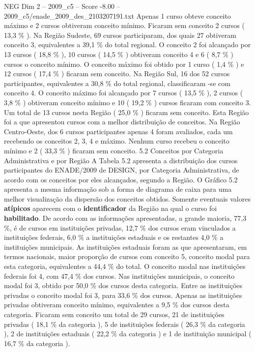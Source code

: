 \begin{textsample}{NEG Dim 2 – 2009\_c5 – Score -8.00 – 2009\_c5/enade\_2009\_des\_2103207191.txt}
Apenas 1 curso obteve conceito máximo e 2 cursos obtiveram conceito mínimo.
Ficaram sem conceito 2 cursos ( 13,3 \% ).
Na Região Sudeste, 69 cursos participaram, dos quais 27 obtiveram conceito 3, equivalentes a 39,1 \% do total regional.
O conceito 2 foi alcançado por 13 cursos ( 18,8 \% ), 10 cursos ( 14,5 \% ) obtiveram conceito 4 e 6 ( 8,7 \% ) cursos o conceito mínimo.
O conceito máximo foi obtido por 1 curso ( 1,4 \% ) e 12 cursos ( 17,4 \% ) ficaram sem conceito.
Na Região Sul, 16 dos 52 cursos participantes, equivalentes a 30,8 \% do total regional, classificaram -se com conceito 4.
O conceito máximo foi alcançado por 7 cursos ( 13,5 \% ), 2 cursos ( 3,8 \% ) obtiveram conceito mínimo e 10 ( 19,2 \% ) cursos ficaram com conceito 3.
Um total de 13 cursos nesta Região ( 25,0 \% ) ficaram sem conceito.
Esta Região foi a que apresentou cursos com a melhor distribuição de conceitos.
Na Região Centro-Oeste, dos 6 cursos participantes apenas 4 foram avaliados, cada um recebendo os conceitos 2, 3, 4 e máximo.
Nenhum curso recebeu o conceito mínimo e 2 ( 33,3 \% ) ficaram sem conceito. 5.2 Conceitos por Categoria Administrativa e por Região A Tabela 5.2 apresenta a distribuição dos cursos participantes do ENADE/2009 de DESIGN, por Categoria Administrativa, de acordo com os conceitos por eles alcançados, segundo a Região.
O Gráfico 5.2 apresenta a mesma informação sob a forma de diagrama de caixa para uma melhor visualização da dispersão dos conceitos obtidos.
Somente eventuais valores \textbf{atípicos} aparecem com o \textbf{identificador} da Região na qual o curso foi \textbf{habilitado}.
De acordo com as informações apresentadas, a grande maioria, 77,3 \%, é de cursos em instituições privadas, 12,7 \% dos cursos eram vinculados a instituições federais, 6,0 \% a instituições estaduais e os restantes 4,0 \% a instituições municipais.
As instituições estaduais foram as que apresentaram, em termos nacionais, maior proporção de cursos com conceito 5, conceito modal para esta categoria, equivalentes a 44,4 \% do total.
O conceito modal nas instituições federais foi 4, com 47,4 \% dos cursos.
Nas instituições municipais, o conceito modal foi 3, obtido por 50,0 \% dos cursos desta categoria.
Entre as instituições privadas o conceito modal foi 3, para 33,6 \% dos cursos.
Apenas as instituições privadas obtiveram conceito mínimo, equivalentes a 9,5 \% dos cursos desta categoria.
Ficaram sem conceito um total de 29 cursos, 21 de instituições privadas ( 18,1 \% da categoria ), 5 de instituições federais ( 26,3 \% da categoria ), 2 de instituições estaduais ( 22,2 \% da categoria ) e 1 de instituição municipal ( 16,7 \% da categoria ).

\end{textsample}
